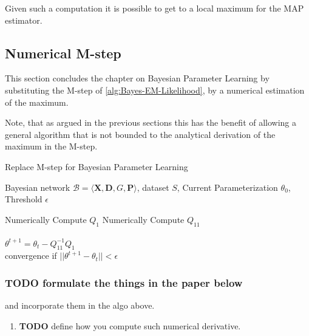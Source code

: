 \documentclass[11pt]{article}
\begin{document}
\begin{article}
Given such a computation it is possible to get to a local maximum
for the MAP estimator.

\subsection{Numerical M-step}
\label{sec:org09fc388}

This section concludes the chapter on Bayesian Parameter Learning
by substituting the M-step of \ref{alg:Bayes-EM-Likelihood}, by a
numerical estimation of the maximum.

Note, that as argued in the previous sections this has the benefit
of allowing a general algorithm that is not bounded to the
analytical derivation of the maximum in the M-step.

\begin{algorithm*}[h!]
\caption{Replace M-step for Bayesian Parameter Learning}
\label{alg:Numerical-M-Step}
\vspace{-10pt}
\begin{multicols}{2}
\begin{algorithmic}[1] 
\Require Bayesian network $\mathcal{B}=\langle \mathbf{X},\mathbf{D}, G, \mathbf{P} \rangle$, dataset $S$, Current Parameterization $\theta_0$, Threshold $\epsilon$

   \State Numerically Compute $Q_1$
   \State Numerically Compute $Q_{11}$\\

   \\
      \State $\theta^{t+1}= \theta_{t} - Q_{11}^{-1} Q_1$\\
      \State convergence if $||\theta^{t+1} - \theta_{t}|| < \epsilon$
   \EndForAll
\end{algorithmic}
\end{multicols}
\end{algorithm*}


\subsubsection{{\bfseries\sffamily TODO} formulate the things in the paper below}
\label{sec:orga5ac8f3}

and incorporate them in the algo above.

\begin{enumerate}
\item {\bfseries\sffamily TODO} define how you compute such numerical derivative.
\label{sec:orgfe5a81f}


\end{enumerate}
\end{article}
\end{document}
